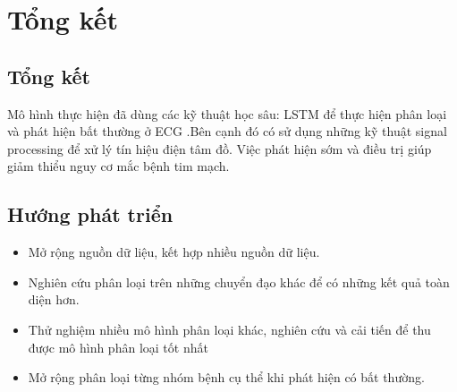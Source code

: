 \chapter{Tổng kết}
\section{Tổng kết}
Mô hình thực hiện đã dùng các kỹ thuật học sâu: LSTM để thực hiện phân loại và phát hiện bất thường ở ECG .Bên cạnh đó có sử dụng những kỹ thuật signal processing để xử lý tín hiệu điện tâm đồ. Việc phát hiện sớm và điều trị giúp giảm thiểu nguy cơ mắc bệnh tim mạch.

\section{Hướng phát triển}
\begin{itemize}
    \item Mở rộng nguồn dữ liệu, kết hợp nhiều nguồn dữ liệu.
    \item Nghiên cứu phân loại trên những chuyển đạo khác để có những kết quả toàn diện hơn.
    \item Thử nghiệm nhiều mô hình phân loại khác, nghiên cứu và cải tiến để thu được mô hình phân loại tốt nhất
    \item Mở rộng phân loại từng nhóm bệnh cụ thể khi phát hiện có bất thường.
\end{itemize}